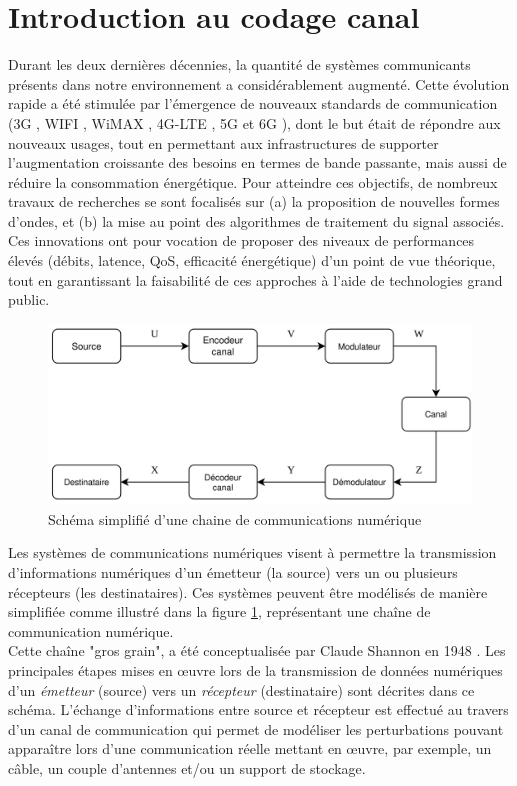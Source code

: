 \documentclass[../main.tex]{subfiles}
\begin{document}
\section{Introduction au codage canal}
%
%
%
Durant les deux dernières décennies, la quantité de systèmes communicants présents dans notre environnement a considérablement augmenté. 
Cette évolution rapide a été stimulée par l'émergence de nouveaux standards de communication (3G \cite{3G}, WIFI \cite{wifi}, WiMAX \cite{wimax}, 4G-LTE \cite{Ref_4G}, 5G \cite{5g} et 6G \cite{Ref_6G}), dont le but était de répondre aux nouveaux usages, tout en permettant aux infrastructures de supporter l’augmentation croissante des besoins en termes de bande passante, mais aussi de réduire la consommation énergétique.
Pour atteindre ces objectifs, de nombreux travaux de recherches se sont focalisés sur (a) la proposition de nouvelles formes d'ondes, et (b) la mise au point des algorithmes de traitement du signal associés. 
Ces innovations ont pour vocation de proposer des niveaux de performances élevés (débits, latence, QoS, efficacité énergétique) d’un point de vue théorique, tout en garantissant la faisabilité de ces approches à l’aide de technologies grand public.
\begin{figure}[H]
    \centering
    \includegraphics[scale=0.3]{chapter2/figs/chainecom.png}
    \caption{Schéma simplifié d'une chaine de communications numérique}
    \label{chainecom}
\end{figure}
Les systèmes de communications numériques visent à permettre la transmission d'informations numériques d'un émetteur (la source) vers un ou plusieurs récepteurs (les destinataires). Ces systèmes peuvent être modélisés de manière simplifiée comme illustré dans la figure \ref{chainecom}, représentant une chaîne de communication numérique.\\
Cette chaîne "gros grain", a été conceptualisée par Claude Shannon en 1948 \cite{Sha48}. Les principales étapes mises en œuvre lors de la transmission de données numériques d'un \textit{émetteur} (source) vers un \textit{récepteur} (destinataire) sont décrites dans ce schéma. L'échange d'informations entre source et récepteur est effectué au travers d'un canal de communication qui permet de modéliser les perturbations pouvant apparaître lors d'une communication réelle mettant en œuvre, par exemple, un câble, un couple d'antennes et/ou un support de stockage.\\
\end{document}
